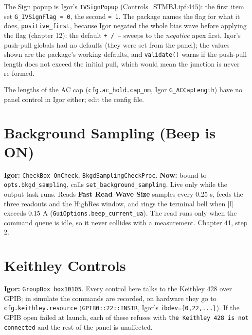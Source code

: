 The Sign popup is Igor's \texttt{IVSign\discretionary{}{}{}Popup} (Controls\_STMBJ.ipf:445): the first item set \texttt{G\_\discretionary{}{}{}IVSign\discretionary{}{}{}Flag = 0}, the second \texttt{= 1}. The package names the flag for what it does, \texttt{positive\_\discretionary{}{}{}first}, because Igor negated the whole bias wave before applying the flag (chapter 12): the default \texttt{+ /\discretionary{}{}{} −} sweeps to the \emph{negative} apex first. Igor's push-pull globals had no defaults (they were set from the panel); the values shown are the package's working defaults, and \texttt{validate()} warns if the push-pull length does not exceed the initial pull, which would mean the junction is never re-formed.

The lengths of the AC cap (\texttt{cfg.\discretionary{}{}{}ac\_\discretionary{}{}{}hold.\discretionary{}{}{}cap\_\discretionary{}{}{}nm}, Igor \texttt{G\_\discretionary{}{}{}ACCap\discretionary{}{}{}Length}) have no panel control in Igor either; edit the config file.

\section{Background Sampling (Beep is ON)}

\textbf{Igor:} \texttt{Check\discretionary{}{}{}Box On\discretionary{}{}{}Check}, \texttt{Bkgd\discretionary{}{}{}Sampling\discretionary{}{}{}Check\discretionary{}{}{}Proc}. \textbf{Now:} bound to \texttt{opts.\discretionary{}{}{}bkgd\_\discretionary{}{}{}sampling}, calls \texttt{set\_\discretionary{}{}{}background\_\discretionary{}{}{}sampling}. Live only while the output task runs. Reads \textbf{Fast Read Wave Size} samples every 0.25 s, feeds the three readouts and the HighRes window, and rings the terminal bell when
|I| exceeds 0.15 \textmu{}A (\texttt{Gui\discretionary{}{}{}Options.\discretionary{}{}{}beep\_\discretionary{}{}{}current\_\discretionary{}{}{}ua}). The read runs only when the command queue is idle, so it never collides with a measurement. Chapter 41, step 2.

\section{Keithley Controls}

\textbf{Igor:} \texttt{Group\discretionary{}{}{}Box box10105}. Every control here talks to the Keithley 428 over GPIB; in simulate the commands are recorded, on hardware they go to \texttt{cfg.\discretionary{}{}{}keithley.\discretionary{}{}{}resource} (\texttt{GPIB0::22::INSTR}, Igor's \texttt{ibdev=\{0,\discretionary{}{}{}22,\discretionary{}{}{}.\discretionary{}{}{}.\discretionary{}{}{}.\discretionary{}{}{}\}}). If the GPIB open failed at launch, each of these refuses with \texttt{the Keithley 428 is not connected} and the rest of the panel is unaffected.

